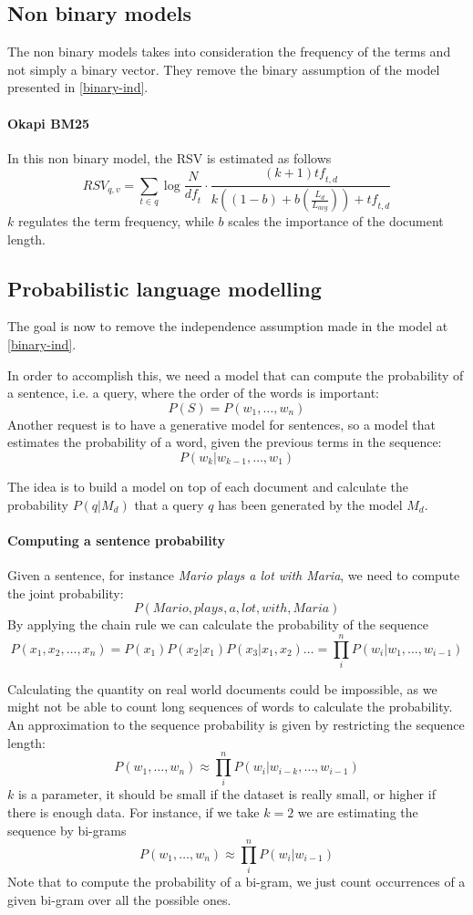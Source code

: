 \subsection{Non binary models}
The non binary models takes into consideration the frequency of the terms 
and not simply a binary vector. They remove the binary assumption 
of the model presented in \vref{binary-ind}.

\paragraph{Okapi BM25}
In this non binary model, the RSV is estimated as follows
$$\mathit{RSV}_{q,v} = \sum_{t \in q}\log \frac{N}{\mathit{df}_t} 
\cdot \frac{(k+1)\mathit{tf}_{t,d}}{k((1-b) + b (\frac{L_d}{L_{\mathit{avg}}})) 
+ \mathit{tf}_{t,d}}$$
$k$ regulates the term frequency, while $b$ scales the importance of 
the document length.

\subsection{Probabilistic language modelling}
The goal is now to remove the independence assumption made in the model 
at \vref{binary-ind}.

In order to accomplish this, we need a model that can compute the probability 
of a sentence, i.e. a query, where the order of the words is important:
$$P(S) = P(w_1, \dots, w_n)$$
Another request is to have a generative model for sentences, so a model 
that estimates the probability of a word, given the previous terms in the 
sequence:
$$P(w_k | w_{k-1}, \dots, w_1)$$

The idea is to build a model on top of each document and calculate 
the probability $P(q|M_d)$ that a query $q$ has been generated by the model 
$M_d$.

\paragraph{Computing a sentence probability}
Given a sentence, for instance \emph{Mario plays a lot with Maria}, 
we need to compute the joint probability:
$$P(\mathit{Mario}, \mathit{plays}, \mathit{a}, \mathit{lot}, \mathit{with}, \mathit{Maria})$$
By applying the chain rule we can calculate the probability of the sequence
$$P(x_1, x_2, \dots, x_n) = P(x_1)P(x_2|x_1)P(x_3|x_1,x_2)\dots = \prod_i^nP(w_i|w_1, \dots, w_{i-1})$$ 

Calculating the quantity on real world documents could be impossible, 
as we might not be able to count long sequences of words to calculate the probability.
An approximation to the sequence probability is given by restricting the sequence length:
$$P(w_1, \dots, w_n) \approx \prod_i^nP(w_i | w_{i-k}, \dots, w_{i-1})$$
$k$ is a parameter, it should be 
small if the dataset is really small, or higher if there is enough data. For instance, 
if we take $k=2$ we are estimating the sequence by bi-grams
$$P(w_1, \dots, w_n) \approx \prod_i^nP(w_i | w_{i-1})$$
Note that to compute the probability of a bi-gram, we just count occurrences of a given bi-gram 
over all the possible ones.

